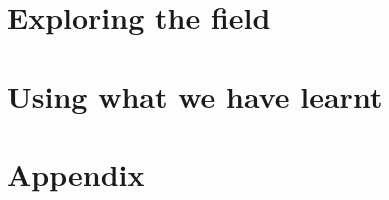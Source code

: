 \documentclass[
		twoside,openright,titlepage,numbers=noenddot,headinclude,%
                footinclude=true,cleardoublepage=empty,
                BCOR=5mm,paper=a4,fontsize=11pt, %
                british, %
                tablecaptionabove]{scrreprt}
\begin{document}
\cleardoublepage %




\part{Exploring the field} %







%


\cleardoublepage %


\cleardoublepage


\part{Using what we have learnt}









\appendix

\part{Appendix} %



\cleardoublepage %



\end{document}
